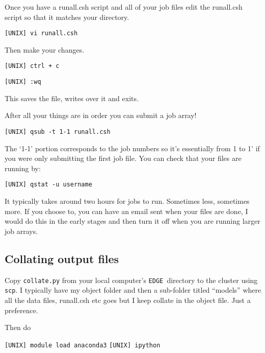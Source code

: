 \documentclass{article}
\newcommand{\edge}{\texttt{EDGE }}
\begin{document}
Once you have a runall.csh script and all of your job files edit the runall.csh script so that it matches your directory. 

\vspace{2mm}
\texttt{[UNIX] vi runall.csh}
\vspace{2mm}

Then make your changes.

\vspace{2mm}
\texttt{[UNIX] ctrl + c}
\vspace{2mm}

\vspace{2mm}
\texttt{[UNIX] :wq }
\vspace{2mm}

This saves the file, writes over it and exits.

After all your things are in order you can submit a job array!

\vspace{2mm}
\texttt{[UNIX] qsub -t 1-1 runall.csh}
\vspace{2mm}

The ‘1-1’ portion corresponds to the job numbers so it’s essentially from 1 to 1’ if you were only submitting the first job file.
You can check that your files are running by: 

\vspace{2mm}
\texttt{[UNIX] qstat -u username}
\vspace{2mm}

It typically takes around two hours for jobs to run. Sometimes less, sometimes more. If you choose to, you can have an email sent when your files are done, I would do this in the early stages and then turn it off when you are running larger job arrays. 

\subsection{Collating output files}

Copy \texttt{collate.py} from your local computer's \edge directory to the cluster using \texttt{scp}.  I typically have my object folder and then a sub-folder titled “models” where all the data files, runall.csh etc goes but I keep collate in the object file. Just a preference. 

Then do

\vspace{2mm}
\texttt{[UNIX] module load anaconda3}
\texttt{[UNIX] ipython}
\vspace{2mm}
\end{document}
